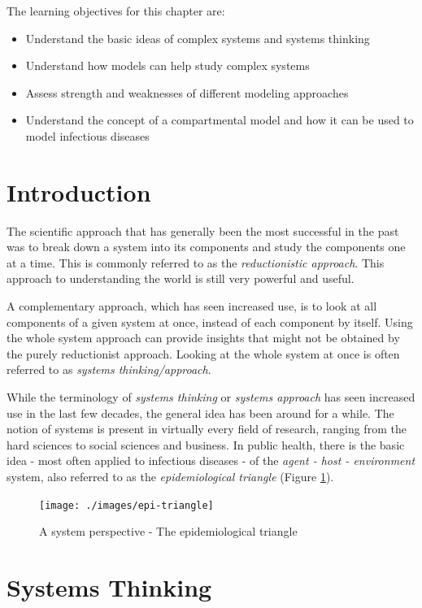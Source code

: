 \documentclass[
]{book}
\providecommand{\tightlist}{%
  \setlength{\itemsep}{0pt}\setlength{\parskip}{0pt}}
\begin{document}
The learning objectives for this chapter are:

\begin{itemize}
\tightlist
\item
  Understand the basic ideas of complex systems and systems thinking
\item
  Understand how models can help study complex systems
\item
  Assess strength and weaknesses of different modeling approaches
\item
  Understand the concept of a compartmental model and how it can be used to model infectious diseases
\end{itemize}

\hypertarget{introduction}{%
\section{Introduction}\label{introduction}}

The scientific approach that has generally been the most successful in the past was to break down a system into its components and study the components one at a time. This is commonly referred to as the \emph{reductionistic approach}. This approach to understanding the world is still very powerful and useful.

A complementary approach, which has seen increased use, is to look at all components of a given system at once, instead of each component by itself. Using the whole system approach can provide insights that might not be obtained by the purely reductionist approach. Looking at the whole system at once is often referred to as \emph{systems thinking/approach}.

While the terminology of \emph{systems thinking} or \emph{systems approach} has seen increased use in the last few decades, the general idea has been around for a while. The notion of systems is present in virtually every field of research, ranging from the hard sciences to social sciences and business. In public health, there is the basic idea - most often applied to infectious diseases - of the \emph{agent - host - environment} system, also referred to as the \emph{epidemiological triangle} (Figure \ref{fig:epitriangle}).

\begin{figure}
\texttt{[image: ./images/epi-triangle]} \caption{A system perspective - The epidemiological triangle}\label{fig:epitriangle}
\end{figure}

\hypertarget{systems-thinking}{%
\section{Systems Thinking}\label{systems-thinking}}
\end{document}
